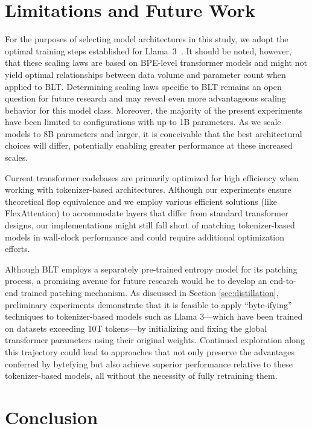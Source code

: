 \section{Limitations and Future Work}

For the purposes of selecting model architectures in this study, we adopt the optimal training steps established for Llama~3~\citep{dubey2024llama}. It should be noted, however, that these scaling laws are based on BPE-level transformer models and might not yield optimal relationships between data volume and parameter count when applied to {\textsc BLT}. Determining scaling laws specific to {\textsc BLT} remains an open question for future research and may reveal even more advantageous scaling behavior for this model class. Moreover, the majority of the present experiments have been limited to configurations with up to 1B parameters. As we scale models to 8B parameters and larger, it is conceivable that the best architectural choices will differ, potentially enabling greater performance at these increased scales.

Current transformer codebases are primarily optimized for high efficiency when working with tokenizer-based architectures. Although our experiments ensure theoretical flop equivalence and we employ various efficient solutions (like FlexAttention) to accommodate layers that differ from standard transformer designs, our implementations might still fall short of matching tokenizer-based models in wall-clock performance and could require additional optimization efforts.

Although {\textsc BLT} employs a separately pre-trained entropy model for its patching process, a promising avenue for future research would be to develop an end-to-end trained patching mechanism. As discussed in Section \ref{sec:distillation}, preliminary experiments demonstrate that it is feasible to apply ``byte-ifying'' techniques to tokenizer-based models such as Llama 3—which have been trained on datasets exceeding 10T tokens—by initializing and fixing the global transformer parameters using their original weights. Continued exploration along this trajectory could lead to approaches that not only preserve the advantages conferred by bytefying but also achieve superior performance relative to these tokenizer-based models, all without the necessity of fully retraining them.

\section{Conclusion}
\label{section:conclusion}

